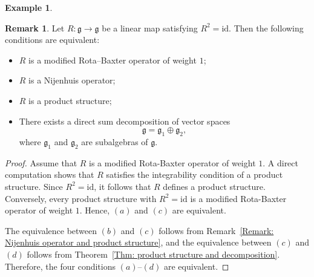 \documentclass[12pt]{amsart}
\theoremstyle{definition}
\newtheorem{remark}[theorem]{Remark}
\newtheorem{exam}[theorem]{Example}
\begin{document}
\begin{exam}
\end{exam}
\begin{remark}
	Let $R:\mathfrak{g}\to\mathfrak{g}$ be a linear map satisfying $R^{2}=\mathrm{id}$.
	Then the following conditions are equivalent:
	\begin{itemize}
		\item[(a)] $R$ is a modified Rota--Baxter operator of weight $1$;
		
		\item[(b)] $R$ is a Nijenhuis operator;
		
		\item[(c)] $R$ is a product structure;
		
		\item[(d)] There exists a direct sum decomposition of vector spaces
		\[
		\mathfrak{g}=\mathfrak{g}_{1}\oplus \mathfrak{g}_{2},
		\]
		where $\mathfrak{g}_{1}$ and $\mathfrak{g}_{2}$ are subalgebras of $\mathfrak{g}$.
	\end{itemize}
\end{remark}

\begin{proof}
	Assume that $R$ is a modified Rota-Baxter operator of weight $1$.
	A direct computation shows that $R$ satisfies the integrability condition of a product structure.
	Since $R^{2}=\mathrm{id}$, it follows that $R$ defines a product structure.
	Conversely, every product structure with $R^{2}=\mathrm{id}$ is a modified Rota-Baxter operator of weight $1$.
	Hence, $(a)$ and $(c)$ are equivalent.
	
	The equivalence between $(b)$ and $(c)$ follows from Remark~\ref{Remark: Nijenhuis operator and product structure},
	and the equivalence between $(c)$ and $(d)$ follows from Theorem~\ref{Thm: product structure and decomposition}.
	Therefore, the four conditions $(a)$--$(d)$ are equivalent.
\end{proof}
\end{document}
